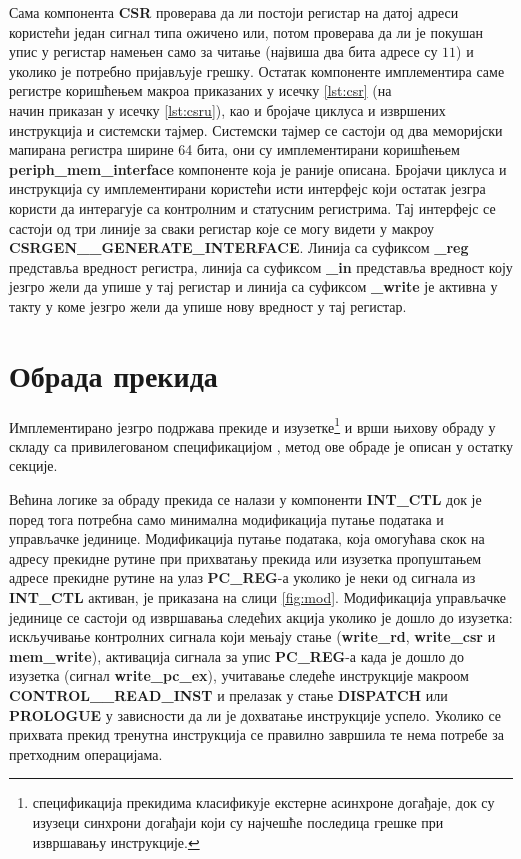 Сама компонента \textbf{CSR} проверава да ли постоји регистар на датој адреси користећи један сигнал типа ожичено или, потом проверава да ли је покушан упис у регистар намењен само за читање (највиша два бита адресе су $11$) и уколико је потребно пријављује грешку. Остатак компоненте имплементира саме регистре коришћењем макроа приказаних у исечку \ref{lst:csr} (на\\ начин приказан у исечку \ref{lst:csru}), као и бројаче циклуса и извршених инструкција и системски тајмер. Системски тајмер се састоји од два меморијски мапирана регистра ширине 64 бита, они су имплементирани коришћењем \textbf{periph\_mem\_interface} компоненте која је раније описана. Бројачи циклуса и инструкција су имплементирани користећи исти интерфејс који остатак језгра користи да интерагује са контролним и статусним регистрима. Тај интерфејс се састоји од три линије за сваки регистар које се могу видети у макроу \textbf{CSRGEN\_\_GENERATE\_INTERFACE}. Линија са суфиксом \textbf{\_reg} представља вредност регистра, линија са суфиксом \textbf{\_in} представља вредност коју језгро жели да упише у тај регистар и линија са суфиксом \textbf{\_write} је активна у такту у коме језгро жели да упише нову вредност у тај регистар.



\section{Обрада прекида}

Имплементирано језгро подржава прекиде и изузетке\footnote{ спецификација прекидима класификује екстерне асинхроне догађаје, док су изузеци синхрони догађаји који су најчешће последица грешке при извршавању инструкције.} и врши њихову обраду у складу са привилегованом спецификацијом \cite{priv_spec}, метод ове обраде је описан у остатку секције.

Већина логике за обраду прекида се налази у компоненти \textbf{INT\_CTL} док је поред тога потребна само минимална модификација путање података и управљачке јединице.
Модификација путање података, која омогућава скок на адресу прекидне рутине при прихватању прекида или изузетка пропуштањем адресе прекидне рутине на улаз \textbf{PC\_REG}-а уколико је неки од сигнала из \textbf{INT\_CTL} активан, је приказана на слици \ref{fig:mod}. Модификација управљачке јединице се састоји од извршавања следећих акција уколико је дошло до изузетка:
искључивање контролних сигнала који мењају стање (\textbf{write\_rd}, \textbf{write\_csr} и \textbf{mem\_write}), активација сигнала за упис \textbf{PC\_REG}-а када је дошло до изузетка (сигнал \textbf{write\_pc\_ex}), учитавање следеће инструкције макроом \textbf{CONTROL\_\_READ\_INST} и прелазак у стање \textbf{DISPATCH} или \textbf{PROLOGUE} у зависности да ли је дохватање инструкције успело. Уколико се прихвата прекид тренутна инструкција се правилно завршила те нема потребе за претходним операцијама.

